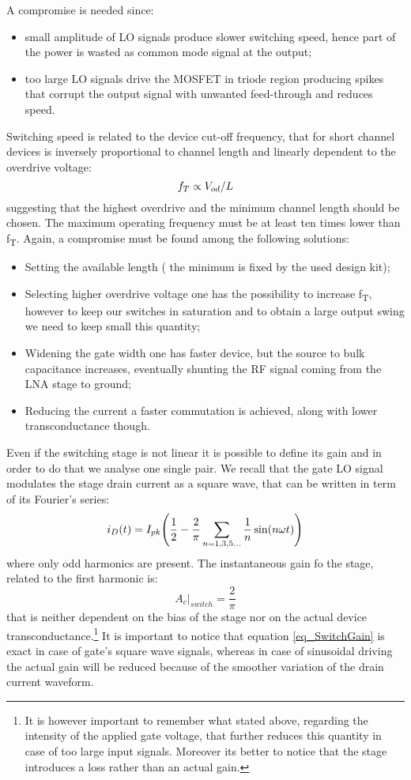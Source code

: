 A compromise is needed since:
\begin{itemize}
	\item small amplitude of LO signals produce slower switching speed, hence part of the power is wasted as common mode signal at the output;
	\item too large LO signals drive the MOSFET in triode region producing spikes that corrupt the output signal with unwanted feed-through  and reduces speed.
\end{itemize}
Switching speed is related to the device cut-off frequency, that for short channel devices is inversely proportional to channel length and linearly dependent to the overdrive voltage:
\begin{equation}
f_T \propto  V_{od}/L \notag
\end{equation}
suggesting that the highest overdrive and the minimum channel length should be chosen.  The maximum operating frequency must be at least ten times lower than f\textsubscript{T}. Again, a compromise must be found among the following solutions:
\begin{itemize}
	\item Setting the available length ( the minimum is fixed by the used design kit);
	\item Selecting higher overdrive voltage one has the possibility to increase f\textsubscript{T}, however to keep our switches in saturation and to obtain a large output swing we need to keep small this quantity;
	\item Widening the gate width one has faster device, but the source to bulk capacitance increases, eventually shunting the RF signal coming from the LNA stage to ground;
	\item Reducing the current a faster commutation is achieved, along with lower transconductance though.
\end{itemize}

Even if the switching stage is not linear it is possible to define its gain and in order to do that we analyse one single pair. We recall that the gate LO signal modulates the stage drain current as a square wave, that can be written in term of its Fourier's series:
\begin{equation}
 i_D(t)=I_{pk}\Bigg(\frac{1}{2}-\frac{2}{\pi} \sum_{n=1,3,5 \dots}^{} \frac{1}{n}\sin(n\omega t)\Bigg) \notag
\end{equation} 
where only odd harmonics are present. The instantaneous gain fo the stage, related to the first harmonic is:
\begin{equation}
\label{eq_SwitchGain}
A_c|_{switch} = \frac{2}{\pi}
\end{equation}
that is neither dependent on the bias of the stage nor on the actual device transconductance.\footnote{It is however important to remember what stated above, regarding the intensity of the applied gate voltage, that further reduces this quantity in case of too large input signals. Moreover its better to notice that the stage introduces a loss rather than an actual gain.} It is important to notice that equation \ref{eq_SwitchGain} is exact in case of gate's square wave signals, whereas in case of sinusoidal driving the actual gain will be reduced because of the smoother variation of the drain current waveform.

